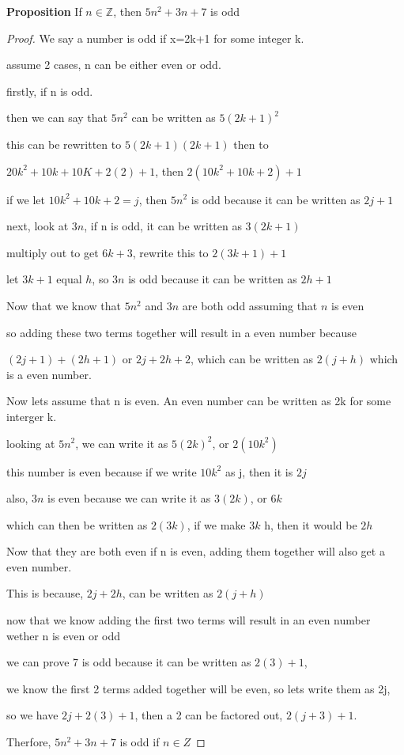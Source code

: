 \documentclass[12pt]{article}
\def\Z{\mathbb Z}
\begin{document}
{\bf Proposition} If $n\in\Z$, then $5n^2+3n+7$ is odd
\begin{proof}
    We say a number is odd if x=2k+1 for some integer k.

    assume 2 cases, n can be either even or odd.

    firstly, if n is odd.

    then we can say that $5n^2$ can be written as $5(2k+1)^2$

    this can be rewritten to $5(2k+1)(2k+1)$ then to

    $20k^2+10k+10K+2(2)+1$, then $2(10k^2+10k+2)+1$

    if we let $10k^2+10k+2 = j$, then $5n^2$ is odd because it can be written as $2j+1$

    next, look at $3n$, if n is odd, it can be written as $3(2k+1)$

    multiply out to get $6k+3$, rewrite this to $2(3k+1)+1$
    
    let $3k+1$ equal $h$, so $3n$ is odd because it can be written as $2h+1$

    Now that we know that $5n^2$ and $3n$ are both odd assuming that $n$ is even

    so adding these two terms together will result in a even number because

    $(2j+1)+(2h+1)$ or $2j+2h+2$, which can be written as $2(j+h)$ which is a even number.

    Now lets assume that n is even. An even number can be written as 2k for some interger k.

    looking at $5n^2$, we can write it as $5(2k)^2$, or $2(10k^2)$

    this number is even because if we write $10k^2$ as j, then it is $2j$

    also, $3n$ is even because we can write it as $3(2k)$, or $6k$

    which can then be written as $2(3k)$, if we make $3k$ h, then it would be $2h$

    Now that they are both even if n is even, adding them together will also get a even number.

    This is because, $2j+2h$, can be written as $2(j+h)$

    now that we know adding the first two terms will result in an even number wether n is even or odd

    we can prove 7 is odd because it can be written as $2(3)+1$,

    we know the first 2 terms added together will be even, so lets write them as 2j,

    so we have $2j+2(3)+1$, then a 2 can be factored out, $2(j+3)+1$.

    Therfore, $5n^2+3n+7$ is odd if $n\in Z$

\end{proof}
\end{document}
